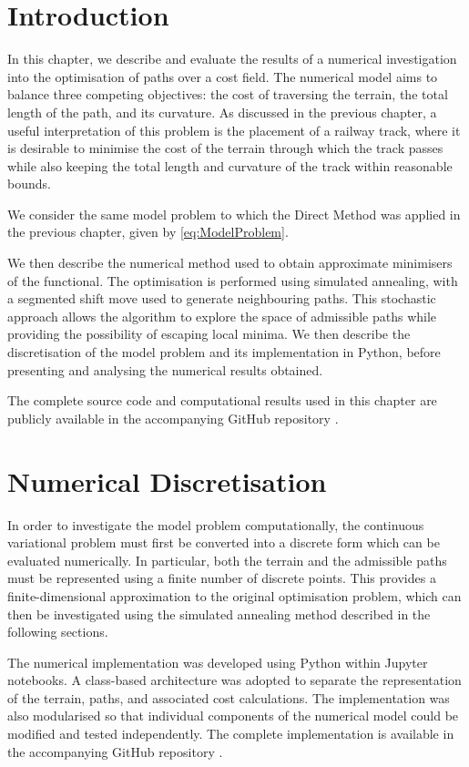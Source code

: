 \section{Introduction}

In this chapter, we describe and evaluate the results of a numerical investigation into the optimisation of paths over a cost field. The numerical model aims to balance three competing objectives: the cost of traversing the terrain, the total length of the path, and its curvature. As discussed in the previous chapter, a useful interpretation of this problem is the placement of a railway track, where it is desirable to minimise the cost of the terrain through which the track passes while also keeping the total length and curvature of the track within reasonable bounds.

We consider the same model problem to which the Direct Method was applied in the previous chapter, given by \eqref{eq:ModelProblem}.

We then describe the numerical method used to obtain approximate minimisers of the functional. The optimisation is performed using simulated annealing, with a segmented shift move used to generate neighbouring paths. This stochastic approach allows the algorithm to explore the space of admissible paths while providing the possibility of escaping local minima. We then describe the discretisation of the model problem and its implementation in Python, before presenting and analysing the numerical results obtained.

The complete source code and computational results used in this chapter are publicly available in the accompanying GitHub repository \cite{skerman2026calculus}.


\section{Numerical Discretisation} 

In order to investigate the model problem computationally, the continuous variational problem must first be converted into a discrete form which can be evaluated numerically. In particular, both the terrain and the admissible paths must be represented using a finite number of discrete points. This provides a finite-dimensional approximation to the original optimisation problem, which can then be investigated using the simulated annealing method described in the following sections.

The numerical implementation was developed using Python within Jupyter notebooks. A class-based architecture was adopted to separate the representation of the terrain, paths, and associated cost calculations. The implementation was also modularised so that individual components of the numerical model could be modified and tested independently. The complete implementation is available in the accompanying GitHub repository \cite{skerman2026calculus}.

